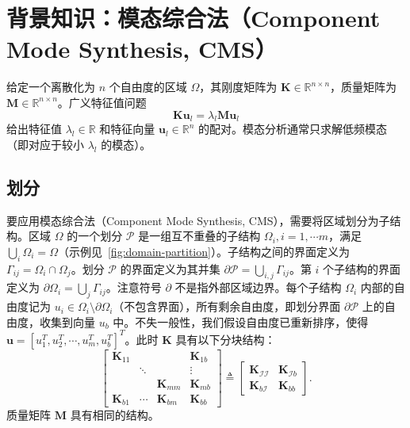 
\section{背景知识：模态综合法（Component Mode Synthesis, CMS）}
给定一个离散化为 $n$ 个自由度的区域 $\Omega$，其刚度矩阵为 $\mathbf{K} \in \mathbb{R}^{n\times n}$，质量矩阵为 $\mathbf{M} \in \mathbb{R}^{n \times n}$。广义特征值问题
\begin{equation} \mathbf{K} \mathbf{u}_l= \lambda_l \mathbf{M} \mathbf{u}_l
  \label{eq:generalize-eigen-problem}
\end{equation}
给出特征值 $\lambda_l \in \mathbb{R}$ 和特征向量 $\mathbf{u}_l\in\mathbb{R}^{n}$ 的配对。模态分析通常只求解低频模态（即对应于较小 $\lambda_l$ 的模态）。

\subsection{划分}
要应用模态综合法（Component Mode Synthesis, CMS），需要将区域划分为子结构。区域 $\Omega$ 的一个划分 $\mathcal{P}$ 是一组互不重叠的子结构 $\Omega_i, i=1, \cdots m$，满足 $\bigcup_i\Omega_i = \Omega$（示例见~\cref{fig:domain-partition}）。子结构之间的界面定义为 $\Gamma_{ij} = \Omega_i \cap \Omega_j$。划分 $\mathcal{P}$ 的界面定义为其并集 $\partial \mathcal{P} = \bigcup_{i,j} \Gamma_{ij}$。第 $i$ 个子结构的界面定义为 $\partial \Omega_i = \bigcup_{j} \Gamma_{ij}$。注意符号 $\partial$ 不是指外部区域边界。每个子结构 $\Omega_i$ 内部的自由度记为 $u_i \in \Omega_i\setminus\partial \Omega_i$（不包含界面），所有剩余自由度，即划分界面 $\partial \mathcal{P}$ 上的自由度，收集到向量 $u_b$ 中。不失一般性，我们假设自由度已重新排序，使得 $\mathbf{u} = [u_1^T, u_2^T, \cdots, u_m^T, u_b^T]^T$。此时 $\mathbf{K}$ 具有以下分块结构：
\begin{equation}
  \left[
    \begin{array}{ccc|c}
      \mathbf{K}_{11} & & & \mathbf{K}_{1b}\\
      &\ddots & & \vdots\\
      & & \mathbf{K}_{mm} & \mathbf{K}_{mb}\\\hline
      \mathbf{K}_{b1} &\cdots
    &\mathbf{K}_{bm} &\mathbf{K}_{bb}
    \end{array}
  \right]
  \triangleq
  \begin{bmatrix}
    \mathbf{K}_{\mathcal{I}\mathcal{I}}&\mathbf{K}_{\mathcal{I}b}\\
    \mathbf{K}_{b\mathcal{I}}&\mathbf{K}_{bb}
  \end{bmatrix}.
\end{equation}
质量矩阵 $\mathbf{M}$ 具有相同的结构。


